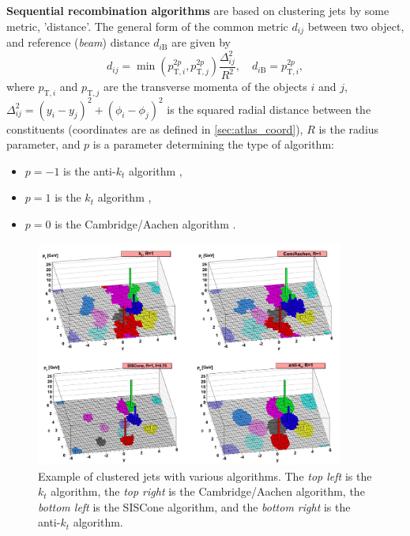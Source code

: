 \textbf{Sequential recombination algorithms} are based on clustering jets by some metric, 'distance'.
The general form of the common metric $d_{ij}$ between two object, and reference (\emph{beam}) distance $d_{i\text{B}}$ are given by \cite{antikt}
\begin{equation}
    \label{eq:kt_distance}
    d_{ij} = \min{(p_{\text{T}, i}^{2p}, p_{\text{T}, j}^{2p})} \frac{\Delta^2_{ij}}{R^2}, \quad d_{i\text{B}} = p_{\text{T}, i}^{2p},
\end{equation}
where $p_{\text{T}, i}$ and $p_{\text{T}, j}$ are the transverse momenta of the objects $i$ and $j$, $\Delta^2_{ij} = (y_i - y_j)^2 + (\phi_i - \phi_j)^2$ is the squared radial distance between the constituents (coordinates are as defined in \cref{sec:atlas_coord}), $R$ is the radius parameter, and $p$ is a parameter determining the type of algorithm:
\begin{itemize}
    \item $p=-1$ is the anti-$k_t$ \footnotemark algorithm \cite{antikt},
    \item $p=1$ is the $k_t$ algorithm \cite{kt},
    \item $p=0$ is the Cambridge/Aachen algorithm \cite{Cam_Aachen_alg}.
\end{itemize}
\begin{figure}[ht]
    \centering
    \includegraphics[width=0.9\textwidth]{src/img/anitkt.png}
    \caption{Example of clustered jets with various algorithms. The \emph{top left} is the $k_t$ algorithm, the \emph{top right} is the Cambridge/Aachen algorithm, the \emph{bottom left} is the SISCone algorithm, and the \emph{bottom right} is the anti-$k_t$ algorithm.}
    \label{fig:jet_reco}
\end{figure}
